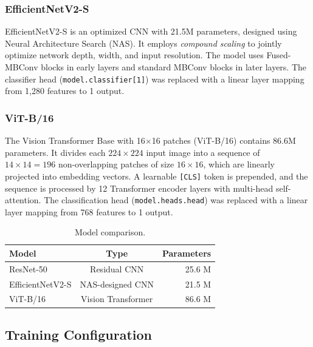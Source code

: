 \documentclass[11pt, a4paper, twocolumn]{article}
\begin{document}
\subsubsection{EfficientNetV2-S}

EfficientNetV2-S \cite{tan2021} is an optimized CNN with 21.5M
parameters, designed using Neural Architecture Search (NAS). It
employs \textit{compound scaling} to jointly optimize network depth,
width, and input resolution. The model uses Fused-MBConv blocks in
early layers and standard MBConv blocks in later layers. The
classifier head (\texttt{model.classifier[1]}) was replaced with
a linear layer mapping from 1,280 features to 1 output.

\subsubsection{ViT-B/16}

The Vision Transformer Base with 16$\times$16 patches (ViT-B/16)
\cite{dosovitskiy2021} contains 86.6M parameters. It divides each
$224 \times 224$ input image into a sequence of $14 \times 14 = 196$
non-overlapping patches of size $16 \times 16$, which are linearly
projected into embedding vectors. A learnable \texttt{[CLS]} token is
prepended, and the sequence is processed by 12 Transformer encoder
layers with multi-head self-attention. The classification head
(\texttt{model.heads.head}) was replaced with a linear layer mapping
from 768 features to 1 output.

\begin{table}[H]
    \centering
    \caption{Model comparison.}
    \label{tab:models}
    \begin{tabular}{@{}lcr@{}}
        \toprule
        \textbf{Model} & \textbf{Type} & \textbf{Parameters} \\
        \midrule
        ResNet-50        & Residual CNN  & 25.6 M \\
        EfficientNetV2-S & NAS-designed CNN & 21.5 M \\
        ViT-B/16         & Vision Transformer & 86.6 M \\
        \bottomrule
    \end{tabular}
\end{table}

\subsection{Training Configuration}
\label{subsec:training}
\end{document}
